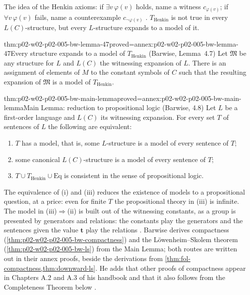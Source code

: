 The idea of the Henkin axioms: if \(\exists v\,\varphi(v)\) holds, name a
witness \(c_{\varphi(v)}\); if \(\forall v\,\varphi(v)\) fails, name a
counterexample \(c_{\neg\varphi(v)}\) \cite[ch.~A.1, \S4, p.~30]{Barwise1977FirstOrder}.
\(T_{\mathrm{Henkin}}\) is not true in every \(L(C)\)-structure, but every
\(L\)-structure expands to a model of it.

\begin{hblemma}{thm:p02-w02-p02-005-bw-lemma-47}{proved=annex:p02-w02-p02-005-bw-lemma-47}{Every structure expands to a model of \(T_{\mathrm{Henkin}}\) (Barwise, Lemma~4.7)}
Let \(\mathfrak M\) be any structure for \(L\) and \(L(C)\) the witnessing
expansion of \(L\).  There is an assignment of elements of \(M\) to the
constant symbols of \(C\) such that the resulting expansion of
\(\mathfrak M\) is a model of \(T_{\mathrm{Henkin}}\).
\end{hblemma}

\begin{hbtheorem}{thm:p02-w02-p02-005-bw-main-lemma}{proved=annex:p02-w02-p02-005-bw-main-lemma}{Main Lemma: reduction to propositional logic (Barwise, 4.8)}
Let \(L\) be a first-order language and \(L(C)\) its witnessing expansion.
For every set \(T\) of sentences of \(L\) the following are equivalent:
\begin{enumerate}
\item[(i)] \(T\) has a model, that is, some \(L\)-structure is a model of
      every sentence of \(T\);
\item[(ii)] some canonical \(L(C)\)-structure is a model of every sentence
      of \(T\);
\item[(iii)] \(T\cup T_{\mathrm{Henkin}}\cup\mathrm{Eq}\) is consistent in
      the sense of propositional logic.
\end{enumerate}
\end{hbtheorem}

The equivalence of (i) and (iii) reduces the existence of models to a
propositional question, at a price: even for finite \(T\) the
propositional theory in (iii) is infinite.  The model in
(iii)\(\Rightarrow\)(ii) is built out of the witnessing constants, as a
group is presented by generators and relations: the constants play the
generators and the sentences given the value \(\mathbf t\) play the
relations \cite[ch.~A.1, \S4, pp.~31--32]{Barwise1977FirstOrder}.
Barwise derives compactness (\cref{thm:p02-w02-p02-005-bw-compactness})
and the L\"owenheim--Skolem theorem (\cref{thm:p02-w02-p02-005-bw-ls}) from
the Main Lemma; both routes are written out in their annex proofs, beside
the derivations from \cref{thm:fol-compactness,thm:downward-ls}.  He adds
that other proofs of compactness appear in Chapters A.2 and A.3 of his
handbook and that it also follows from the Completeness Theorem below
\cite[ch.~A.1, \S4, p.~33]{Barwise1977FirstOrder}.

